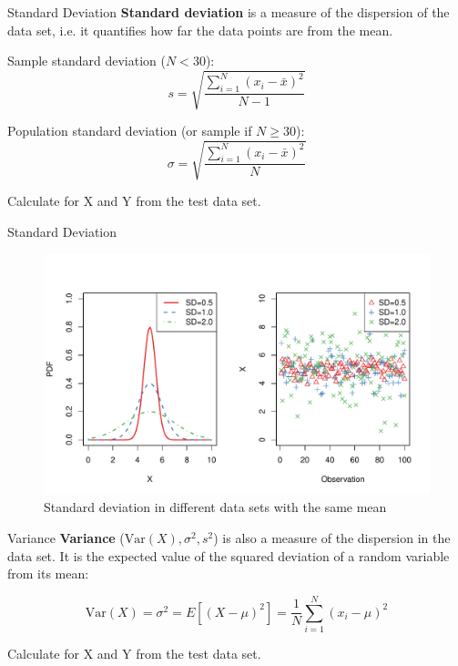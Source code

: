 \begin{frame}{Standard Deviation}
    \textbf{Standard deviation} is a measure of the dispersion of the data set, i.e. it quantifies how far the data points are from the mean.
    
    Sample standard deviation ($N < 30$):
    \begin{equation}
    s = \sqrt{\frac{\sum_{i=1}^{N} (x_i - \bar{x})^2}{N-1}}
    \end{equation}
    
    Population standard deviation (or sample if $N \geq 30$):
    \begin{equation}
    \sigma = \sqrt{\frac{\sum_{i=1}^{N} (x_i - \bar{x})^2}{N}}
    \end{equation}
    
    \begin{example}
        \medskip
        Calculate for X and Y from the test data set.
    \end{example}
\end{frame}

\begin{frame}{Standard Deviation}
    \begin{figure}
        \includegraphics[width=\textwidth]{R/plots/SD}
        Standard deviation in different data sets with the same mean
    \end{figure}
\end{frame}

\begin{frame}{Variance}
    \textbf{Variance} ($\text{Var}(X), \sigma^2, s^2$) is also a measure of the dispersion in the data set. It is the expected value of the squared deviation of a random variable from its mean:
    
    \begin{equation}
    \text{Var}(X) = \sigma^2 = E[(X - \mu)^2] = \frac{1}{N} \sum_{i=1}^{N}(x_i - \mu)^2
    \end{equation}
    
    \begin{example}
        \medskip
        Calculate for X and Y from the test data set.
    \end{example}
\end{frame}

